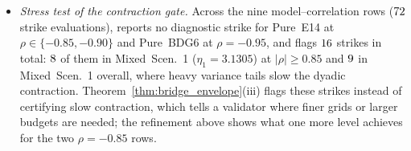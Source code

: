 \begin{itemize}
  \item \emph{Stress test of the contraction gate.} Across the nine model--correlation rows ($72$ strike evaluations), \RCBridge{} reports no diagnostic strike for Pure~E14 at $\rho\in\{-0.85,-0.90\}$ and Pure~BDG6 at $\rho=-0.95$, and flags $16$ strikes in total: $8$ of them in Mixed~Scen.~1 ($\eta_1=3.1305$) at $|\rho|\ge 0.85$ and $9$ in Mixed~Scen.~1 overall, where heavy variance tails slow the dyadic contraction. Theorem~\ref{thm:bridge_envelope}(iii) flags these strikes instead of certifying slow contraction, which tells a validator where finer grids or larger budgets are needed; the refinement above shows what one more level achieves for the two $\rho=-0.85$ rows.
\end{itemize}

\FloatBarrier
